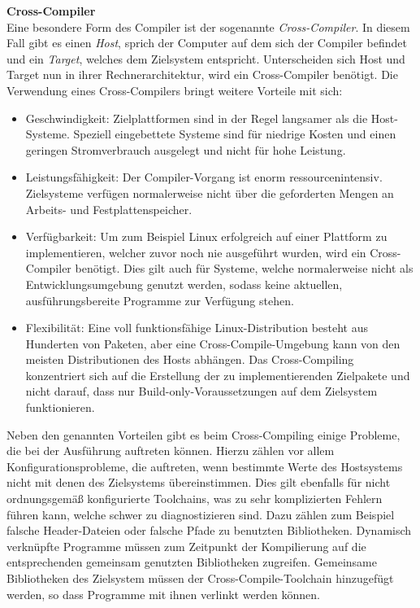 \textbf{Cross-Compiler}\\
Eine besondere Form des Compiler ist der sogenannte \emph{Cross-Compiler}. In diesem Fall gibt es einen \emph{Host}, sprich der Computer auf dem sich der Compiler befindet und ein
\emph{Target}, welches dem Zielsystem entspricht. Unterscheiden sich Host und Target nun in ihrer Rechnerarchitektur, wird ein Cross-Compiler benötigt.
Die Verwendung eines Cross-Compilers bringt weitere Vorteile mit sich:
\begin{itemize}
  \item Geschwindigkeit: Zielplattformen sind in der Regel langsamer als die Host-Systeme. Speziell eingebettete Systeme sind für niedrige Kosten und einen geringen Stromverbrauch ausgelegt
                          und nicht für hohe Leistung.
  \item Leistungsfähigkeit: Der Compiler-Vorgang ist enorm ressourcenintensiv. Zielsysteme verfügen normalerweise nicht über die geforderten Mengen an Arbeits- und Festplattenspeicher.
  \item Verfügbarkeit: Um zum Beispiel Linux erfolgreich auf einer Plattform zu implementieren, welcher zuvor noch nie ausgeführt wurden, wird ein Cross-Compiler benötigt. Dies gilt auch für
                      Systeme, welche normalerweise nicht als Entwicklungsumgebung genutzt werden, sodass keine aktuellen, ausführungsbereite Programme zur Verfügung stehen.
  \item Flexibilität: Eine voll funktionsfähige Linux-Distribution besteht aus Hunderten von Paketen, aber eine Cross-Compile-Umgebung kann von den meisten Distributionen des Hosts abhängen.
                      Das Cross-Compiling konzentriert sich auf die Erstellung der zu implementierenden Zielpakete und nicht darauf, dass nur Build-only-Voraussetzungen auf dem Zielsystem funktionieren.
\end{itemize}


Neben den genannten Vorteilen gibt es beim Cross-Compiling einige Probleme, die bei der Ausführung auftreten können. Hierzu zählen vor allem Konfigurationsprobleme, die auftreten, wenn
bestimmte Werte des Hostsystems nicht mit denen des Zielsystems übereinstimmen. Dies gilt ebenfalls für nicht ordnungsgemäß konfigurierte Toolchains, was zu sehr komplizierten Fehlern führen kann,
welche schwer zu diagnostizieren sind. Dazu zählen zum Beispiel falsche Header-Dateien oder falsche Pfade zu benutzten Bibliotheken. Dynamisch verknüpfte Programme müssen zum Zeitpunkt
der Kompilierung auf die entsprechenden gemeinsam genutzten Bibliotheken zugreifen. Gemeinsame Bibliotheken des Zielsystem müssen der Cross-Compile-Toolchain hinzugefügt werden,
 so dass Programme mit ihnen verlinkt werden können.~\cite{crosscompiler}
